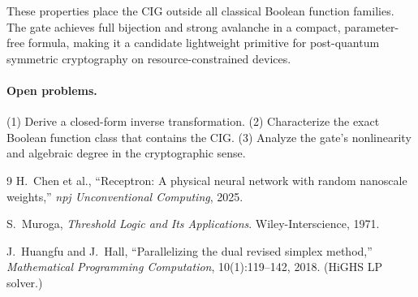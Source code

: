 \documentclass[10pt,a4paper]{article}
\begin{document}
These properties place the CIG outside all classical Boolean function
families. The gate achieves full bijection and strong avalanche in a compact,
parameter-free formula, making it a candidate lightweight primitive for
post-quantum symmetric cryptography on resource-constrained devices.

\paragraph{Open problems.}
(1) Derive a closed-form inverse transformation.
(2) Characterize the exact Boolean function class that contains the CIG.
(3) Analyze the gate's nonlinearity and algebraic degree in the cryptographic sense.


\begin{thebibliography}{9}
H.\ Chen et al.,
``Receptron: A physical neural network with random nanoscale weights,''
\textit{npj Unconventional Computing}, 2025.

S.\ Muroga,
\textit{Threshold Logic and Its Applications}.
Wiley-Interscience, 1971.

J.\ Huangfu and J.\ Hall,
``Parallelizing the dual revised simplex method,''
\textit{Mathematical Programming Computation}, 10(1):119--142, 2018.
(HiGHS LP solver.)
\end{thebibliography}
\end{document}
